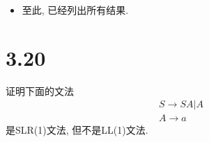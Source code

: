\documentclass[UTF8]{article}
\newcommand{\blt}{\bullet}
\begin{document}
\begin{itemize}
\begin{itemize}
$$\begin{array}{ll}
		\end{array}\right.$$
	\item 从$I_4, I_5$无法继续了
	\item 从$I_6$出发
		\begin{itemize}
		\item 考虑$goto(I_6,T)$, 得到
			$$I_9\left\{\begin{array}{ll}
			E\rightarrow  E+T\blt & ,+/\$\\
			T\rightarrow T\blt F & ,a/b/+/\$\\
			F\rightarrow\blt F* & , a/b/+/*/\$\\
			F\rightarrow\blt a & ,a/b/+/*/\$\\
			F\rightarrow\blt b & ,a/b/+/*/\$\\
			\end{array}\right.$$
		\item 考虑$goto(I_6,F)$, 得到$I_3$
		\item 考虑$goto(I_6,a)$和$goto(I_6,b)$, 分别得到$I_4, I_5$
		\end{itemize}
	\item 从$I_7$出发, 考虑$goto(I_7,*)$, 得到$I_8$
	\item 从$I_8$莫得出发
	\item 从$I_9$
		\begin{itemize}
		\item 考虑$goto(I_9,F)$, 得到$I_7$
		\item 考虑$goto(I_9,a), goto(I_9,b)$分别得到$I_4,I_5$
		\end{itemize}
	\end{itemize}
\item 至此, 已经列出所有结果.
\end{itemize}


\newpage
\section*{3.20}
\noindent 证明下面的文法
$$\begin{array}{l}
S\rightarrow SA|A\\
A\rightarrow a
\end{array}$$
是SLR(1)文法, 但不是LL(1)文法.\\
\end{document}
